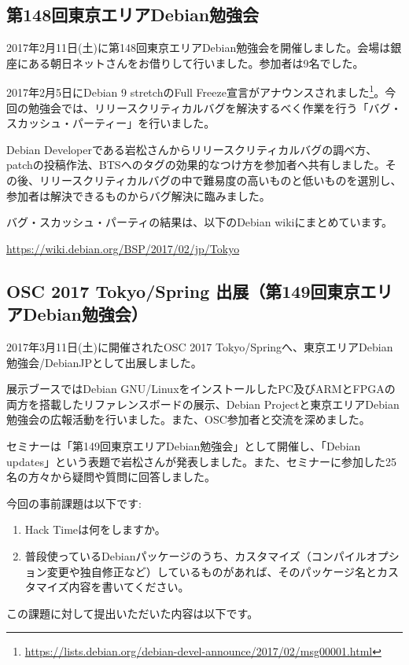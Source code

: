\documentclass[mingoth,a4paper]{jsarticle}
\begin{document}

\subsection{第148回東京エリアDebian勉強会}

2017年2月11日(土)に第148回東京エリアDebian勉強会を開催しました。会場は銀座にある朝日ネットさんをお借りして行いました。参加者は9名でした。

2017年2月5日にDebian 9 stretchのFull Freeze宣言がアナウンスされました\footnote{\url{https://lists.debian.org/debian-devel-announce/2017/02/msg00001.html}}。今回の勉強会では、リリースクリティカルバグを解決するべく作業を行う「バグ・スカッシュ・パーティー」を行いました。

Debian Developerである岩松さんからリリースクリティカルバグの調べ方、patchの投稿作法、BTSへのタグの効果的なつけ方を参加者へ共有しました。その後、リリースクリティカルバグの中で難易度の高いものと低いものを選別し、参加者は解決できるものからバグ解決に臨みました。

バグ・スカッシュ・パーティの結果は、以下のDebian wikiにまとめています。

\url{https://wiki.debian.org/BSP/2017/02/jp/Tokyo}


\subsection{OSC 2017 Tokyo/Spring 出展（第149回東京エリアDebian勉強会）}

2017年3月11日(土)に開催されたOSC 2017 Tokyo/Springへ、東京エリアDebian勉強会/DebianJPとして出展しました。

展示ブースではDebian GNU/LinuxをインストールしたPC及びARMとFPGAの両方を搭載したリファレンスボードの展示、Debian Projectと東京エリアDebian勉強会の広報活動を行いました。また、OSC参加者と交流を深めました。

セミナーは「第149回東京エリアDebian勉強会」として開催し、「Debian updates」という表題で岩松さんが発表しました。また、セミナーに参加した25名の方々から疑問や質問に回答しました。



今回の事前課題は以下です:
\begin{enumerate}
  \item Hack Timeは何をしますか。
  \item 普段使っているDebianパッケージのうち、カスタマイズ（コンパイルオプション変更や独自修正など）しているものがあれば、そのパッケージ名とカスタマイズ内容を書いてください。
\end{enumerate}
この課題に対して提出いただいた内容は以下です。
\begin{multicols}{2}
{\small

}
\end{multicols}
\end{document}
